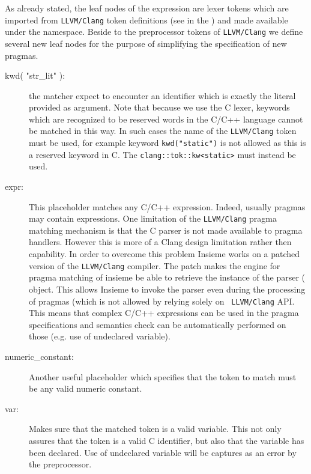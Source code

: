 As already stated, the leaf nodes of the expression are lexer tokens which are
imported from {\tt LLVM/Clang} token definitions (see in the
) and made available under the
 namespace. Beside to the preprocessor tokens of
{\tt LLVM/Clang} we define several new leaf nodes for the purpose of simplifying
the specification of new pragmas. 

\begin{description}
\item [kwd( "str\_lit" ):] the matcher expect to encounter an identifier which is
exactly the literal provided as argument. Note that because we use the C lexer,
keywords which are recognized to be reserved words in the C/C++ language cannot
be matched in this way. In such cases the name of the {\tt LLVM/Clang} token
must be used, for example keyword {\tt kwd("static")} is not allowed as this is
a reserved keyword in C. The {\tt clang::tok::kw<static>} must instead be used. 

\item [expr:] This placeholder matches any C/C++ expression. Indeed, usually
pragmas may contain expressions. One limitation of the {\tt LLVM/Clang} pragma
matching mechanism is that the C parser is not made available to pragma
handlers. However this is more of a Clang design limitation rather then
capability. In order to overcome this problem Insieme works on a patched version
of the {\tt LLVM/Clang} compiler.  The patch makes the engine for pragma
matching of insieme be able to retrieve the instance of the parser
( object.  This allows Insieme to invoke the parser even
during the processing of pragmas (which is not allowed by relying solely on {\tt
LLVM/Clang} API. This means that complex C/C++ expressions can be used in the
pragma specifications and semantics check can be automatically performed on
those (e.g. use of undeclared variable). 

\item [numeric\_constant:] Another useful placeholder which specifies that the
token to match must be any valid numeric constant. 

\item [var:] Makes sure that the matched token is a valid variable. This not
only assures that the token is a valid C identifier, but also that the variable
has been declared. Use of undeclared variable will be captures as an error by
the preprocessor. 
\end{description}

